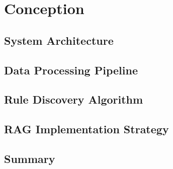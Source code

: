 \chapter{Conception}
\label{ch:conception}

\section{System Architecture}
\label{sec:system-architecture}


\section{Data Processing Pipeline}
\label{sec:data-pipeline}


\section{Rule Discovery Algorithm}
\label{sec:rule-discovery}


\section{RAG Implementation Strategy}
\label{sec:rag-strategy}


\section{Summary}
\label{sec:conception-summary}

